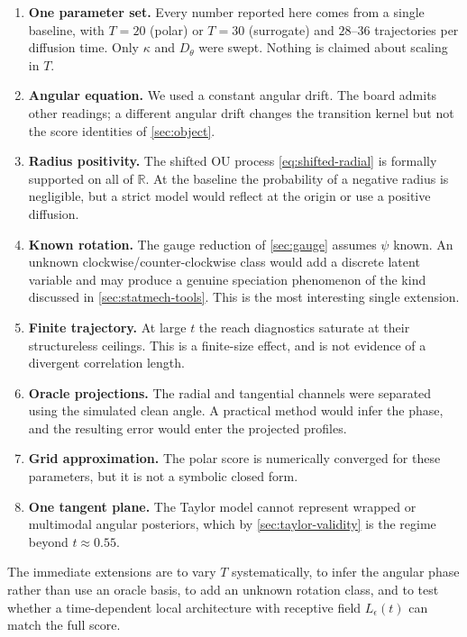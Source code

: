 \documentclass[11pt,a4paper]{article}
\newcommand{\R}{\mathbb{R}}
\begin{document}
\begin{enumerate}
\item \textbf{One parameter set.} Every number reported here comes from a single baseline, with
      $T=20$ (polar) or $T=30$ (surrogate) and $28$--$36$ trajectories per diffusion time.
      Only $\kappa$ and $D_\theta$ were swept. Nothing is claimed about scaling in $T$.
\item \textbf{Angular equation.} We used a constant angular drift. The board admits other
      readings; a different angular drift changes the transition kernel but not the score
      identities of \cref{sec:object}.
\item \textbf{Radius positivity.} The shifted OU process \eqref{eq:shifted-radial} is formally
      supported on all of $\R$. At the baseline the probability of a negative radius is
      negligible, but a strict model would reflect at the origin or use a positive diffusion.
\item \textbf{Known rotation.} The gauge reduction of \cref{sec:gauge} assumes $\psi$ known.
      An unknown clockwise/counter-clockwise class would add a discrete latent variable and may
      produce a genuine speciation phenomenon of the kind discussed in
      \cref{sec:statmech-tools}. This is the most interesting single extension.
\item \textbf{Finite trajectory.} At large $t$ the reach diagnostics saturate at their
      structureless ceilings. This is a finite-size effect, and is not evidence of a divergent
      correlation length.
\item \textbf{Oracle projections.} The radial and tangential channels were separated using the
      simulated clean angle. A practical method would infer the phase, and the resulting error
      would enter the projected profiles.
\item \textbf{Grid approximation.} The polar score is numerically converged for these
      parameters, but it is not a symbolic closed form.
\item \textbf{One tangent plane.} The Taylor model cannot represent wrapped or multimodal
      angular posteriors, which by \cref{sec:taylor-validity} is the regime beyond
      $t\approx0.55$.
\end{enumerate}

The immediate extensions are to vary $T$ systematically, to infer the angular phase rather
than use an oracle basis, to add an unknown rotation class, and to test whether a
time-dependent local architecture with receptive field $L_\epsilon(t)$ can match the full
score.
\end{document}
